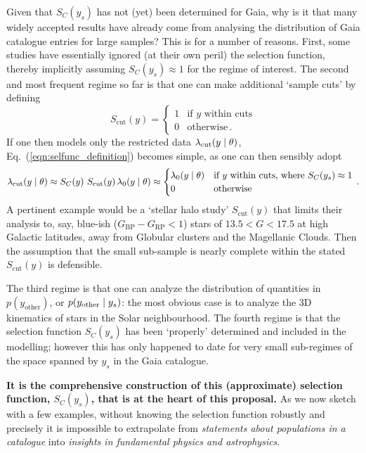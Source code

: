 Given that $S_C(y_s)$ has not (yet) been determined for Gaia, why is it that many widely accepted results have already come from analysing the distribution of Gaia catalogue entries for large samples? This is for a number of reasons. First, some studies have essentially ignored (at their own peril) the selection function, thereby implicitly assuming $S_C(y_s)\approx 1$ for the regime of interest. The second and most frequent regime so far is that one can make additional `sample cuts' by defining
\begin{equation*}
    S_\mathrm{cut}(y) = \begin{cases} 1 & \text{if } y \text{ within cuts} \\ 
0 &\text{otherwise}\,. \end{cases}
\end{equation*}
If one then models only the restricted data $\lambda_\mathrm{cut}(y\mid\theta)$, Eq.~(\ref{eqn:selfunc_definition}) becomes simple, as one can then sensibly adopt
\begin{equation*}
    \lambda_\mathrm{cut}(y\given\theta) \approx %
    S_C(y)~S_\mathrm{cut}(y)\, \lambda_0(y\given \theta) \approx  \begin{cases}  \lambda_0(y\given\theta) &\text{if } y \text{ within cuts, where\ } S_C(y_s)\approx 1\\ 
0 &\text{otherwise} \end{cases}\,.
\end{equation*}
A pertinent example would be a `stellar halo study' $S_\mathrm{cut}(y)$ that limits their analysis to, say, blue-ish ($G_\mathrm{BP}-G_\mathrm{RP}<1$) stars of $13.5<G<17.5$ at high Galactic latitudes, away from Globular clusters and the Magellanic Clouds. Then the assumption that the small sub-sample is nearly complete within the stated $S_\mathrm{cut}(y)$ is defensible.

The third regime is that one can analyze the distribution of quantities in $p(y_\mathrm{other})$, or $p(y_\mathrm{other}\mid y_s)$: the most obvious case is to analyze the 3D kinematics of stars in the Solar neighbourhood. The fourth regime is that the selection function $S_C(y_s)$ has been `properly' determined and included in the modelling; however this has only happened to date for very small sub-regimes of the space spanned by $y_s$ in the Gaia catalogue.

\textbf{It is the comprehensive construction of this (approximate) selection function, $S_C(y_s)$, that is at the heart of this proposal.} As we now sketch with a few examples, without knowing the selection function robustly and precisely it is impossible to extrapolate from \textit{statements about populations in a catalogue} into \textit{insights in fundamental physics and astrophysics}.

